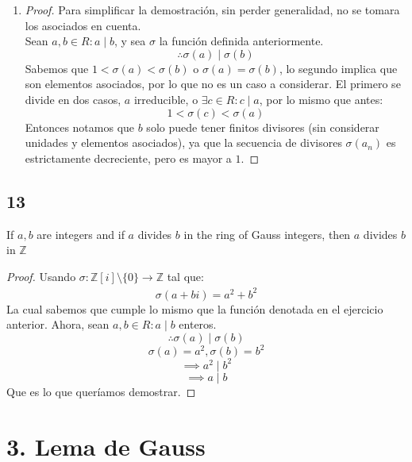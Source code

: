 \documentclass[11pt]{article}
\newcommand{\set}[1]{\mathbb{#1}}
\newcommand{\func}[5]{#1:#2\xrightarrow[#5]{#4}#3}
\theoremstyle{definition}
\begin{document}
\begin{enumerate}[label=\textbf{(\alph*)}]
        \item \begin{proof}
            Para simplificar la demostración, sin perder generalidad, no se tomara los asociados en cuenta.\\
            Sean $a,b\in R:a\mid b$, y sea $\sigma$ la función definida anteriormente.
            \[\therefore \sigma(a)\mid\sigma(b)\]
            Sabemos que $1<\sigma(a)<\sigma(b)$ o $\sigma(a)=\sigma(b)$, lo segundo implica que son elementos asociados, por lo que no es un caso a considerar. El primero se divide en dos casos, $a$ irreducible, o $\exists c\in R: c\mid a$, por lo mismo que antes:
            \[1<\sigma(c)<\sigma(a)\]
            Entonces notamos que $b$ solo puede tener finitos divisores (sin considerar unidades y elementos asociados), ya que la secuencia de divisores $\sigma(a_n)$ es estrictamente decreciente, pero es mayor a $1$.
        \end{proof}
    \end{enumerate}

    \subsection{13}
    If $a,b$ are integers and if $a$ divides $b$ in the ring of Gauss integers, then $a$ divides $b$ in $\set{Z}$
    \begin{proof}
        Usando $\func{\sigma}{\set{Z}[i]\setminus\{0\}}{\set{Z}}{}{}$ tal que:
        \[\sigma(a+bi)=a^2+b^2\]
        La cual sabemos que cumple lo mismo que la función denotada en el ejercicio anterior. Ahora, sean $a,b\in R:a\mid b$ enteros.
        \[\therefore \sigma(a)\mid\sigma(b)\]
        \[\sigma(a)=a^2,\sigma(b)=b^2\]
        \[\implies a^2\mid b^2\]
        \[\implies a\mid b\]
        Que es lo que queríamos demostrar.
    \end{proof}

    \section{3. Lema de Gauss}
\end{document}
